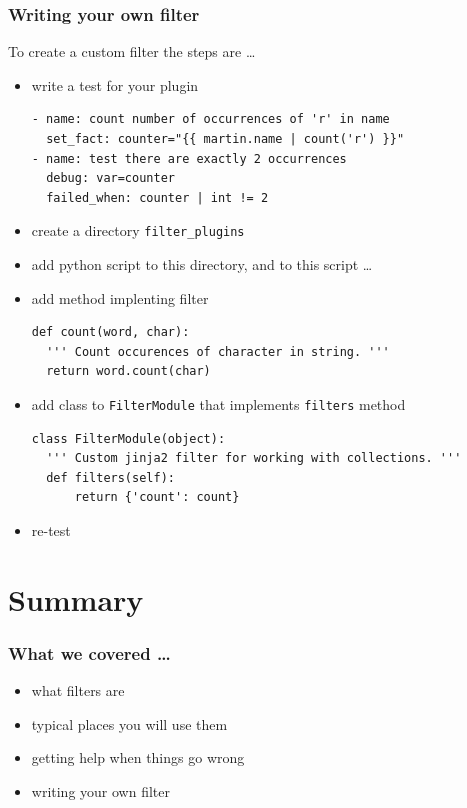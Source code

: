 \documentclass[pdf]{beamer}
\begin{document}
\begin{frame}[fragile]
  \frametitle{Writing your own filter}
  To create a custom filter the steps are \ldots
  \begin{itemize}[<+->]
    \item \alert<1>{write a test for your plugin}
      \begin{lstlisting}
- name: count number of occurrences of 'r' in name
  set_fact: counter="{{ martin.name | count('r') }}"
- name: test there are exactly 2 occurrences
  debug: var=counter
  failed_when: counter | int != 2
      \end{lstlisting}
    \item \alert<2>{create a directory \texttt{filter\_plugins}}
    \item \alert<3>{add python script to this directory, and to this script \ldots}
    \item[] \alert<4>{add method implenting filter}
      \begin{lstlisting}
def count(word, char):
  ''' Count occurences of character in string. '''
  return word.count(char)
      \end{lstlisting}
    \item[] \alert<5>{add class to \texttt{FilterModule} that implements \texttt{filters} method}
      \begin{lstlisting}
class FilterModule(object):
  ''' Custom jinja2 filter for working with collections. '''
  def filters(self):
      return {'count': count}
      \end{lstlisting}
    \item \alert<6>{re-test}
  \end{itemize}
\end{frame}

\section{Summary}

\begin{frame}
  \frametitle{What we covered \ldots}
    \pause{}
  \begin{itemize}[<+->]
    \item{what filters are}
    \item{typical places you will use them}
    \item{getting help when things go wrong}
    \item{writing your own filter}
  \end{itemize}
\end{frame}
\end{document}
